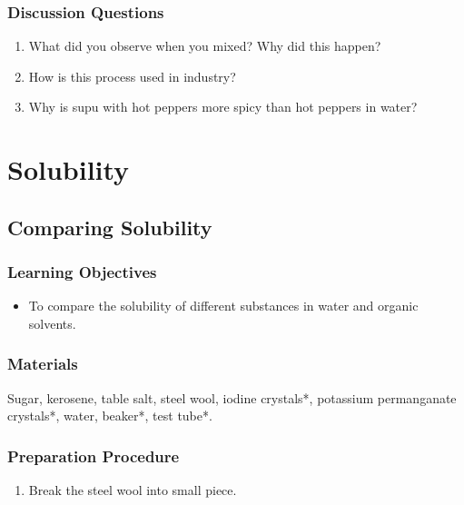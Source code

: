 \subsubsection*{Discussion Questions}
\begin{enumerate}
\item{What did you observe when you mixed? Why did this happen?}
\item{How is this process used in industry?}
\item{Why is supu with hot peppers more spicy than hot peppers in water?}
\end{enumerate}




\section{Solubility}

\subsection{Comparing Solubility}

\subsubsection*{Learning Objectives}
\begin{itemize}
\item{To compare the solubility of different substances in water and organic solvents.}
\end{itemize}

\subsubsection*{Materials}
Sugar, kerosene, table salt, steel wool, iodine crystals*, potassium permanganate crystals*, water, beaker*, test tube*.

\subsubsection*{Preparation Procedure}
\begin{enumerate}
\item{Break the steel wool into small piece.}
\end{enumerate}

